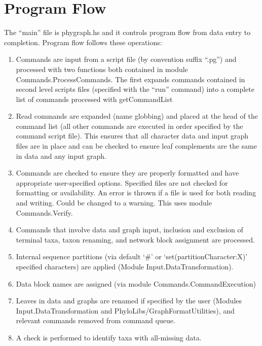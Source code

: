 \documentclass[11pt]{article}
\begin{document}
	\section{Program Flow}
	The ``main'' file is phygraph.hs and it controls program flow from data entry to completion.
	Program flow follows these operations:
	\begin{enumerate}
		\item{Commands are input from a script file (by convention suffix ``.pg'') and processed with two functions both contained in module Commands.ProcessCommands.  The first expands commands contained in second level scripts files (specified with the ``run'' command) into a complete
		list of commands processed with getCommandList} 
	
		\item{Read commands are expanded (name globbing) and placed at the head of the command list (all other commands are executed in order
			specified by the command script file).  This ensures that all character data and input graph files are in place and can be checked to 
			ensure leaf complements are the same in data and any input graph.}
		
		\item{Commands are checked to ensure they are properly formatted and have appropriate user-specified options.  Specified files are not checked
			for formatting or availability.  An error is thrown if a file is used for both reading and writing.  Could be changed to a warning.
			This uses module Commands.Verify.}
		
		\item{Commands that involve data and graph input, inclusion and exclusion of terminal taxa, taxon renaming, and network 
			block assignment are processed.}
		
		\item{Internal sequence partitions (via default `\#' or `set(partitionCharacter:X)' specified characters) are applied (Module Input.DataTransformation).}
		
		\item{Data block names are assigned (via module Commands.CommandExecution)}
		
		\item{Leaves in data and graphs are renamed if specified by the user (Modules Input.DataTransformation and PhyloLibs/GraphFormatUtilities), 
			and relevant commands
			removed from command queue.}
		
		\item{A check is performed to identify taxa with all-missing data.}
		

\end{enumerate}
\end{document}
